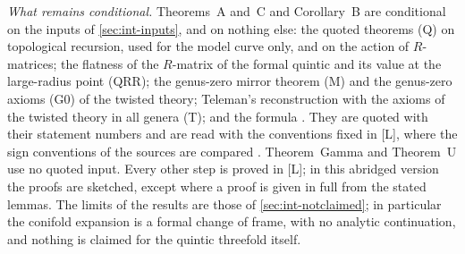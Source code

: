 \emph{What remains conditional.} Theorems~A and~C and Corollary~B are conditional on the inputs of \cref{sec:int-inputs}, and on nothing else: the quoted theorems (Q) on topological recursion, used for the model curve only, and on the action of $R$-matrices; the flatness of the $R$-matrix of the formal quintic and its value at the large-radius point (QRR); the genus-zero mirror theorem (M) and the genus-zero axioms (G0) of the twisted theory; Teleman's reconstruction with the axioms of the twisted theory in all genera (T); and the formula \cite[(1.7)]{AC96}. They are quoted with their statement numbers and are read with the conventions fixed in [L], where the sign conventions of the sources are compared . Theorem~Gamma and Theorem~U use no quoted input. Every other step is proved in [L]; in this abridged version the proofs are sketched, except where a proof is given in full from the stated lemmas. The limits of the results are those of \cref{sec:int-notclaimed}; in particular the conifold expansion is a formal change of frame, with no analytic continuation, and nothing is claimed for the quintic threefold itself.
